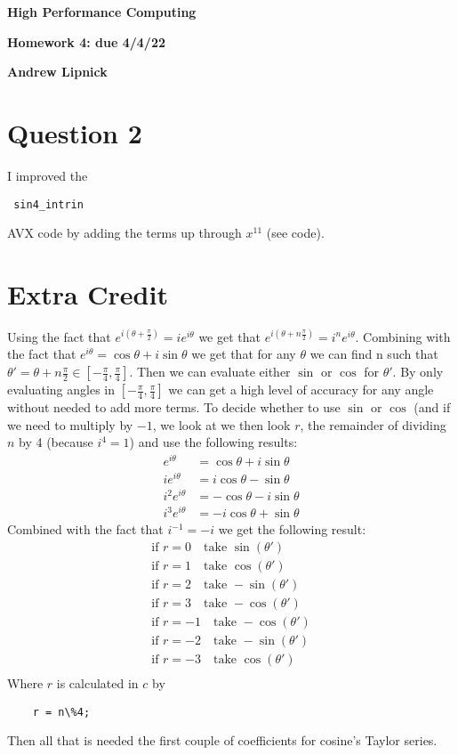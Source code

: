 \documentclass{article}
\begin{document}
\begin{center}
\textbf{High Performance Computing}

\textbf{Homework 4: due 4/4/22}

\textbf{Andrew Lipnick}

\end{center}

\section*{Question 2}
I improved the  \begin{verbatim} sin4_intrin \end{verbatim} AVX code by adding the terms up through $x^{11}$ (see code).
\section*{Extra Credit}
Using the fact that $e^{i(\theta + \frac{\pi}{2})} = ie^{i\theta}$ we get that $e^{i(\theta + n\frac{\pi}{2})} = i^ne^{i\theta}$. Combining with the fact that $e^{i\theta} = \cos\theta+ i\sin\theta$ we get that for any $\theta$ we can find n such that $\theta' = \theta + n\frac{\pi}{2} \in [-\frac{\pi}{4},\frac{\pi}{4}]$. Then we can evaluate either $\sin$ or $\cos$ for $\theta'$. By only evaluating angles in $[-\frac{\pi}{4},\frac{\pi}{4}]$ we can get a high level of accuracy for any angle without needed to add more terms. To decide whether to use $\sin$ or $\cos$ (and if we need to multiply by $-1$, we look at we then look $r$, the remainder of dividing $n$ by 4 (because $i^4 = 1$) and use the following results:
\begin{align*}
    e^{i\theta} &= \cos\theta+ i\sin\theta\\
    ie^{i\theta} &= i\cos\theta - \sin\theta\\
    i^2e^{i\theta} &= -\cos\theta - i\sin\theta\\
    i^3 e^{i\theta} &= -i \cos\theta+ 
    \sin\theta
\end{align*}
Combined with the fact that $i^{-1} = -i$ we get the following result:
\begin{align*}
    \text{if } r = 0 \quad \text{take } \sin(\theta')\\
    \text{if } r = 1 \quad \text{take } \cos(\theta')\\
    \text{if } r = 2 \quad \text{take } -\sin(\theta')\\
    \text{if } r = 3 \quad \text{take } -\cos(\theta')\\
    \text{if } r = -1 \quad \text{take } -\cos(\theta')\\
    \text{if } r = -2 \quad \text{take } -\sin(\theta')\\
    \text{if } r = -3 \quad \text{take } \cos(\theta')\\
\end{align*}
Where $r$ is calculated in $c$ by
\begin{verbatim}
    r = n\%4;
\end{verbatim}
Then all that is needed the first couple of coefficients for cosine's Taylor series.
\end{document}
